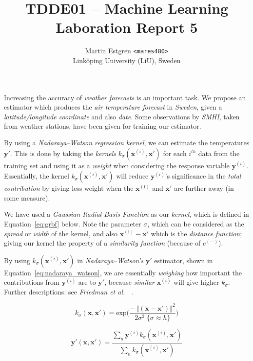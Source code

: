 \documentclass[a4paper, 12pt]{article}
\title{TDDE01 -- Machine Learning \\
Laboration Report 5}
\author{{Martin Estgren \texttt{<mares480>}} \\
{Linköping University (LiU), Sweden}}
\begin{document}
    \maketitle %

    Increasing the accuracy of \emph{weather forecasts} is an important task. We propose an estimator which produces the \emph{air temperature forecast} in \emph{Sweden}, given a \emph{latitude/longitude coordinate} and also \emph{date}. Some observations by \emph{SMHI}, taken from weather stations, have been given for training our estimator.

    By using a \emph{Nadaraya–Watson regression kernel}, we can estimate the temperatures \(\bm{y'}\). This is done by taking the \emph{kernels} \(k_\sigma(\bm{x}^{(i)}, \bm{x'})\) for each \(i^{th}\) data from the training set and using it as a \emph{weight} when considering the response variable \(\bm{y}^{(i)}\). Essentially, the kernel \(k_\sigma(\bm{x}^{(i)}, \bm{x'})\) will reduce \(\bm{y}^{(i)}\)'s significance in the \emph{total contribution} by giving less weight when the \(\bm{x^{(i)}}\) and \(\bm{x'}\) are further away (in some measure).

    We have used a \emph{Gaussian Radial Basis Function} as our \emph{kernel}, which is defined in Equation~\ref{eq:grbf} below. Note the parameter \(\sigma\), which can be considered as the \emph{spread} or \emph{width} of the kernel, and also \(\bm{x^{(i)}} - \bm{x'}\) which is the \emph{distance function}; giving our kernel the property of a \emph{similarity function} (because of \(e^{(\cdots)}\)).

    By using \(k_\sigma(\bm{x}^{(i)}, \bm{x'})\) in \emph{Nadaraya–Watson's} \(\bm{y'}\) estimator, shown in Equation~\ref{eq:nadaraya_watson}, we are essentially \emph{weighing} how important the contributions from \(\bm{y}^{(i)}\) are to \(\bm{y'}\), because \emph{similar} \(\bm{x}^{(i)}\) will give higher \(k_\sigma\). Further descriptions: see \emph{Friedman et al.\ }~\cite{friedman2009elements}.

    \begin{equation} \label{eq:grbf}
    k_\sigma(\bm{x}, \bm{x'}) = \mathrm{exp}\bigg(\frac{- \, {\left\Vert(\bm{x} - \bm{x'}) \right\Vert}^2}
    {2\sigma^2 \; \{\sigma \approx h\}}\bigg)
    \end{equation}

    

    \begin{equation} \label{eq:nadaraya_watson}
    \bm{y'}(\bm{x}, \bm{x'}) = \frac{\sum_n{\bm{y}^{(i)}k_\sigma(\bm{x}^{(i)}, \bm{x'})}}
    {\sum_n{k_\sigma(\bm{x}^{(i)}, \bm{x'})}}
    \end{equation}
\end{document}
